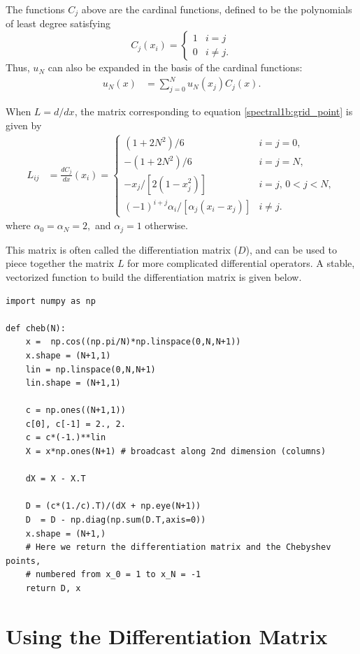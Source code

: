 The functions $C_j$ above are the cardinal functions, defined to be the polynomials of least degree satisfying
\begin{equation*}
C_j(x_i) = \begin{cases} 1 & i=j \\ 0 & i \not = j.
   \end{cases}
\end{equation*}
Thus, $u_N$ can also be expanded in the basis of the cardinal functions:
\begin{align*}
	u_N(x) &= \sum_{j=0}^N u_N(x_j)C_j(x).
\end{align*}

When $L = d/dx$, the matrix corresponding to equation \eqref{spectral1b:grid_point} is given by
\begin{align*}
L_{ij} &= \frac{dC_j}{dx}(x_i) =
\begin{cases} (1+2N^2)/6 & i=j=0, \\ -(1+2N^2)/6 & i=j=N, \\
-x_j/[2(1-x_j^2)] & i=j, \, 0<j<N, \\
(-1)^{i+j}\alpha_i/[\alpha_j(x_i-x_j)] & i \not = j.
   \end{cases}
\end{align*}
where $\alpha_0 = \alpha_N = 2,$ and $\alpha_j = 1$ otherwise.

This matrix is often called the differentiation matrix ($D$), and can be used to piece together the matrix $L$ for more complicated differential operators.
A stable, vectorized function to build the differentiation matrix is given below.


\begin{lstlisting}
import numpy as np

def cheb(N):
	x =  np.cos((np.pi/N)*np.linspace(0,N,N+1))
	x.shape = (N+1,1)
	lin = np.linspace(0,N,N+1)
	lin.shape = (N+1,1)
	
	c = np.ones((N+1,1))
	c[0], c[-1] = 2., 2.
	c = c*(-1.)**lin
	X = x*np.ones(N+1) # broadcast along 2nd dimension (columns)
	
	dX = X - X.T
	
	D = (c*(1./c).T)/(dX + np.eye(N+1))
	D  = D - np.diag(np.sum(D.T,axis=0))
	x.shape = (N+1,)
	# Here we return the differentiation matrix and the Chebyshev points,
	# numbered from x_0 = 1 to x_N = -1
	return D, x

\end{lstlisting}



\section*{Using the Differentiation Matrix}


